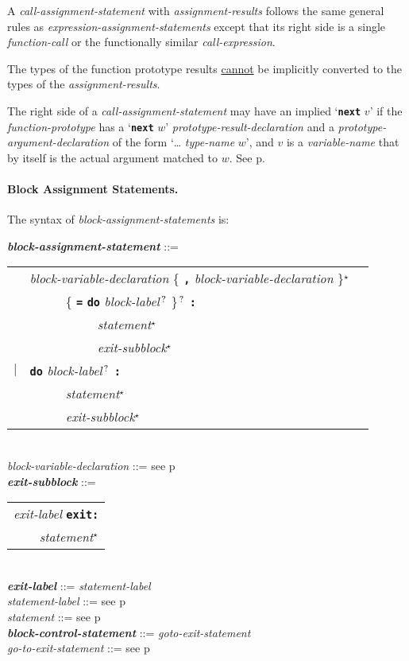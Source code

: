 \documentclass[12pt]{article}
\newcommand{\subsubsubsection}[1]{\paragraph[#1]{#1.}}
\newcommand{\TT}[1]{{\tt \bfseries #1}}
\newcommand{\STAR}{{\Large $^\star$}}
\newcommand{\QMARK}{{$^{\,\mbox{\footnotesize ?}}$}}
\newcommand{\ttkey}[1]{{\tt \bfseries #1}}
\newcommand{\emkey}[1]{{\em \bfseries #1}}
\newcommand{\pagref}[1]{p\pageref{#1}}
\newenvironment{indpar}[1][0.3in]%
	{\begin{list}{}%
		     {\setlength{\itemsep}{0in}%
		      \setlength{\topsep}{0in}%
		      \setlength{\parsep}{1ex}%
		      \setlength{\labelwidth}{#1}%
		      \setlength{\leftmargin}{#1}%
		      \addtolength{\leftmargin}{\labelsep}}%
	 \item}%
	{\end{list}}
\begin{document}
A {\em call-assignment-statement} with {\em assignment-results}
follows the same general rules
as {\em expres\-sion-assignment-state\-ments} except that its right
side is a single {\em function-call} or the functionally similar
{\em call-expression}.

The types of the function prototype results \underline{cannot}
be implicitly converted to the types of the {\em assignment-results}.

\label{CALL-NEXT-PROMOTION}
The right side of a {\em call-assignment-statement} may have
an implied `\TT{next} $v$' if the {\em function-prototype} has 
a `\TT{next} $w$' {\em prototype-result-declaration}
and a {\em prototype-argument-declaration} of the
form `\dots{} {\em type-name} $w$', and $v$ is a {\em variable-name}
that by itself is the actual argument matched to $w$.
See \pagref{PROTOTYPE-NEXT-RESULT}.

\subsubsubsection{Block Assignment Statements}
\label{BLOCK-ASSIGNMENT-STATEMENTS}

The syntax of {\em block-assignment-statements} is:

\begin{indpar}
\emkey{block-assignment-statement} ::= \\
\hspace*{0.5in}
    \begin{tabular}[t]{@{}rll}
        & {\em block-variable-declaration}
                \{ \TT{,} {\em block-variable-declaration} \}\STAR{} \\
	& ~~~~~ \{ \TT{=} \ttkey{do} {\em block-label}\QMARK{} \}\QMARK{}
		   \TT{:} \\
        & ~~~~~~~~~~ {\em statement}\STAR{} \\
        & ~~~~~~~~~~ {\em exit-subblock}\STAR{} \\
    $|$ & \ttkey{do} {\em block-label}\QMARK{} \TT{:} \\
        & ~~~~~ {\em statement}\STAR{} \\
        & ~~~~~ {\em exit-subblock}\STAR{} \\
    \end{tabular}
\\[0.5ex]
{\em block-variable-declaration} ::=
    see \pagref{BLOCK-VARIABLE-DECLARATION}
\\[0.5ex]
\emkey{exit-subblock}\label{EXIT-SUBBLOCK} ::=
    \begin{tabular}[t]{l}
    {\em exit-label} \ttkey{exit}\TT{:} \\
    \TT{~~~~}{\em statement}\STAR{} \\
    \end{tabular} \\
\emkey{exit-label} ::= {\em statement-label}
\\[0.5ex]
{\em statement-label} ::= see \pagref{STATEMENT-LABEL} \\
{\em statement} ::= see \pagref{STATEMENT} \\
\emkey{block-control-statement}\label{BLOCK-CONTROL-STATEMENT}
	::= {\em goto-exit-statement} \\
{\em go-to-exit-statement} ::= see \pagref{GO-TO-STATEMENT}
\end{indpar}
\end{document}
